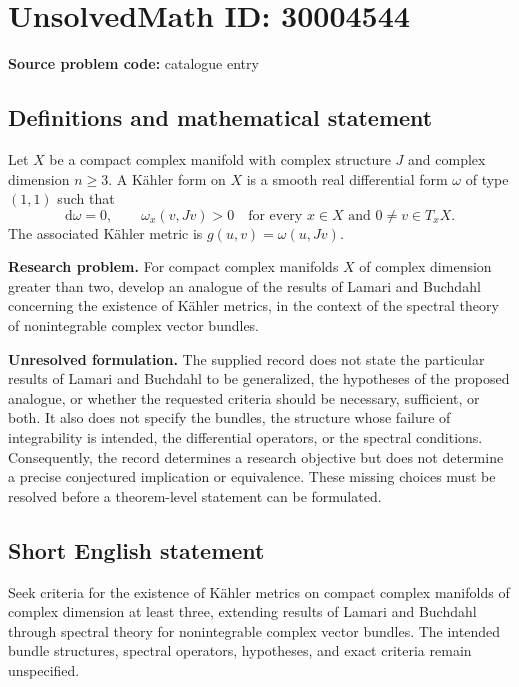 \documentclass[11pt]{article}
\begin{document}
\section*{UnsolvedMath ID: 30004544}
\textbf{Source problem code:} catalogue entry
\subsection{Definitions and mathematical statement}
Let \(X\) be a compact complex manifold with complex structure \(J\) and complex dimension \(n\geq 3\). A K\"ahler form on \(X\) is a smooth real differential form \(\omega\) of type \((1,1)\) such that
\[
\mathrm d\omega=0,\qquad \omega_x(v,Jv)>0\quad\text{for every }x\in X\text{ and }0\ne v\in T_xX.
\]
The associated K\"ahler metric is \(g(u,v)=\omega(u,Jv)\).

\textbf{Research problem.} For compact complex manifolds \(X\) of complex dimension greater than two, develop an analogue of the results of Lamari and Buchdahl concerning the existence of K\"ahler metrics, in the context of the spectral theory of nonintegrable complex vector bundles.

\textbf{Unresolved formulation.} The supplied record does not state the particular results of Lamari and Buchdahl to be generalized, the hypotheses of the proposed analogue, or whether the requested criteria should be necessary, sufficient, or both. It also does not specify the bundles, the structure whose failure of integrability is intended, the differential operators, or the spectral conditions. Consequently, the record determines a research objective but does not determine a precise conjectured implication or equivalence. These missing choices must be resolved before a theorem-level statement can be formulated.
\subsection{Short English statement}
Seek criteria for the existence of K\"ahler metrics on compact complex manifolds of complex dimension at least three, extending results of Lamari and Buchdahl through spectral theory for nonintegrable complex vector bundles. The intended bundle structures, spectral operators, hypotheses, and exact criteria remain unspecified.
\end{document}
